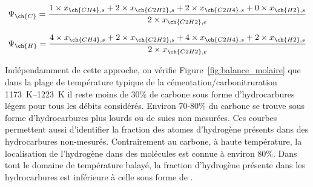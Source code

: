 \begin{equation}
  \Psi_{\ch{C}}=\dfrac{1\times x_{\ch{CH4},s}+2\times x_{\ch{C2H2},s}+2\times x_{\ch{C2H4},s}+0\times x_{\ch{H2},s}}{2\times x_{\ch{C2H2},e}}
  \label{eq:psi_c}
\end{equation}

\begin{equation}
  \Psi_{\ch{H}}=\dfrac{4\times x_{\ch{CH4},s}+2\times x_{\ch{C2H2},s}+4\times x_{\ch{C2H4},s}+2\times x_{\ch{H2},s}}{2\times x_{\ch{C2H2},e}}
  \label{eq:psi_h}
\end{equation}

Indépendamment de cette approche, on vérifie Figure~\ref{fig:balance_molaire} que dans la plage de température typique de la cémentation/carbonitruration \textendash{} \SIrange{1173}{1223}{\kelvin} \textendash{} il reste moins de 30\% de carbone sous forme d'hydrocarbures légers pour tous les débits considérés.  Environ 70-80\% du carbone se trouve sous forme d'hydrocarbures plus lourds ou de suies non mesurées. Ces courbes permettent aussi d'identifier la fraction des atomes d'hydrogène présents dans des hydrocarbures non-mesurés. Contrairement au carbone, à haute température, la localisation de l'hydrogène dans des molécules est connue à environ 80\%. Dans tout le domaine de température balayé, la fraction d'hydrogène présente dans les hydrocarbures est inférieure à celle sous forme de .

